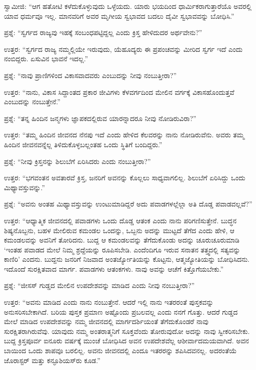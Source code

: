 ಸ್ವಾಮೀಜಿ: “ಆಗ ಹತೋಟಿ ಕಳೆದುಕೊಳ್ಳುವುದು ಒಳ್ಳೆಯದು. ಯಾರು ಭಯದಿಂದ ಧಾರ್ಮಿಕರಾಗುತ್ತಾರೆಯೊ ಅವರಲ್ಲಿ ಯಾವ ಧರ್ಮವೂ ಇಲ್ಲ. ಮಾನವರಿಗೆ ಅವರ ಮೃಗೀಯ ಸ್ವಭಾವದ ಬದಲು ದೈವೀ ಸ್ವಭಾವವನ್ನು ಬೋಧಿಸಿ.”

ಪ್ರಶ್ನೆ: “ಸ್ವರ್ಗದ ರಾಜ್ಯವು ಇಹಕ್ಕೆ ಸಂಬಂಧಪಟ್ಟಿದ್ದಲ್ಲ ಎಂದು ಕ್ರಿಸ್ತ ಹೇಳಿದುದರ ಅರ್ಥವೇನು?''

ಉತ್ತರ: “ಸ್ವರ್ಗದ ರಾಜ್ಯ ನಮ್ಮಲ್ಲಿಯೇ ಇರುವುದು, ಯೆಹೂದ್ಯರು ಈ ಪ್ರಪಂಚವನ್ನು ಮೀರಿದ ಸ್ವರ್ಗ ಇದೆ ಎಂದು ನಂಬಿದ್ದರು. ಏಸುವಿನ ಭಾವನೆ ಇದಲ್ಲ.”

ಪ್ರಶ್ನೆ: “ನಾವು ಪ್ರಾಣಿಗಳಿಂದ ವಿಕಾಸವಾದವರು ಎಂಬುದನ್ನು ನೀವು ನಂಬುತ್ತೀರಾ?''

ಉತ್ತರ: “ನಾನು, ವಿಕಾಸ ಸಿದ್ದಾಂತದ ಪ್ರಕಾರ ಜೀವಿಗಳು ಕೆಳವರ್ಗದಿಂದ ಮೇಲಿನ ವರ್ಗಕ್ಕೆ ವಿಕಾಸಹೊಂದುತ್ತವೆ ಎಂಬುದನ್ನು ನಂಬುತ್ತೇನೆ.”

ಪ್ರಶ್ನೆ: “ತನ್ನ ಹಿಂದಿನ ಜನ್ಮಗಳು ಜ್ಞಾಪಕದಲ್ಲಿರುವ ಯಾರನ್ನಾದರೂ ನೀವು ನೋಡಿರುವಿರಾ?”

ಉತ್ತರ: “ತಮ್ಮ ಹಿಂದಿನ ಜೀವನದ ನೆನಪು ಇದೆ ಎಂದು ಹೇಳಿದ ಕೆಲವರನ್ನು ನಾನು ನೋಡಿರುವೆನು. ಅವರು ತಮ್ಮ ಹಿಂದಿನ ಜೀವನವನ್ನೆಲ್ಲ ತಿಳಿದುಕೊಳ್ಳಬಲ್ಲಂತಹ ಒಂದು ಸ್ಥಿತಿಗೆ ಬಂದಿದ್ದರು.''

ಪ್ರಶ್ನೆ: “ನೀವು ಕ್ರಿಸ್ತನನ್ನು ಶಿಲುಬೆಗೆ ಏರಿಸಿದರು ಎಂದು ನಂಬುತ್ತೀರಾ?”

ಉತ್ತರ: “ಭಗವಂತನ ಅವತಾರವೆ ಕ್ರಿಸ್ತ, ಜನರಿಗೆ ಅವನನ್ನು ಕೊಲ್ಲಲು ಸಾಧ್ಯವಾಗಲಿಲ್ಲ. ಶಿಲುಬೆಗೆ ಏರಿಸಿದ್ದು ಒಂದು ಮಿಥ್ಯಾವಸ್ತುವನ್ನು.”

ಪ್ರಶ್ನೆ: “ಅವನು ಅಂತಹ ಮಿಥ್ಯಾವಸ್ತುವನ್ನು ಉಂಟುಮಾಡಿದ್ದರೆ ಅದು ಪವಾಡಗಳಲ್ಲೆಲ್ಲಾ ಅತಿ ದೊಡ್ಡ ಪವಾಡವಲ್ಲವೆ?”

ಉತ್ತರ: “ಆಧ್ಯಾತ್ಮಿಕ ಜೀವನದಲ್ಲಿ ಪವಾಡಗಳು ಒಂದು ದೊಡ್ಡ ಆತಂಕ ಎಂದು ನಾನು ಪರಿಗಣಿಸುತ್ತೇನೆ. ಬುದ್ಧನ ಶಿಷ್ಯನೊಬ್ಬನು, ಬಹಳ ಮೇಲಿರುವ ಕಮಂಡಲ ಒಂದನ್ನು, ಒಬ್ಬನು ಅದನ್ನು ಮುಟ್ಟದೆ ತೆಗೆದ ಎಂದು ಹೇಳಿ, ಆ ಕಮಂಡಲವನ್ನು ಅವನಿಗೆ ತೋರಿದನು. ಬುದ್ದ ಆ ಕಮಂಡಲವನ್ನು ತೆಗೆದುಕೊಂಡು ಅದನ್ನು ಚೂರುಚೂರುಮಾಡಿ `ಇಂತಹ ಪವಾಡದ ಮೇಲೆ ನಿಮ್ಮ ಶ್ರದ್ದೆಯನ್ನು ರೂಪಿಸಬೇಡಿ. ಎಂದೆಂದಿಗೂ ಇರುವ ಸನಾತನ ತತ್ತ್ವದಲ್ಲಿ ಸತ್ಯವನ್ನು ಕಾಣಿರಿ' ಎಂದನು. ಬುದ್ದನು ಜನರಿಗೆ ನಿಜವಾದ ಅಂತರ್ಜ್ಯೋತಿಯನ್ನು ಕೊಟ್ಟನು, ಆತ್ಮಜ್ಯೋತಿಯನ್ನು ಬೋಧಿಸಿದನು. ಇದೊಂದೆ ಸುರಕ್ಷಿತವಾದ ಮಾರ್ಗ. ಪವಾಡಗಳು ಆತಂಕಗಳು. ನಾವು ಅವನ್ನು ಆಚೆಗೆ ಕಿತ್ತೊಗೆಯಬೇಕು.”

ಪ್ರಶ್ನೆ: “ಜೀಸಸ್ ಗುಡ್ಡದ ಮೇಲಿನ ಉಪದೇಶವನ್ನು ಮಾಡಿದ ಎಂದು ನೀವು ನಂಬುತ್ತೀರಾ?”

ಉತ್ತರ: “ಅವನು ಮಾಡಿದ ಎಂದು ನಾನು ನಂಬುತ್ತೇನೆ. ಆದರೆ ಇಲ್ಲಿ ನಾನು ಇತರರಂತೆ ಪುಸ್ತಕವನ್ನು ಅನುಸರಿಸಬೇಕಾಗಿದೆ. ಬರಿಯ ಪುಸ್ತಕ ಪ್ರಮಾಣ ಅಷ್ಟೊಂದು ಪ್ರಬಲವಲ್ಲ ಎಂದು ನನಗೆ ಗೊತ್ತು. ಆದರೆ ಗುಡ್ಡದ ಮೇಲೆ ಮಾಡಿದ ಉಪದೇಶವನ್ನು ನಮ್ಮ ಜೀವನದಲ್ಲಿ ಮಾರ್ಗದರ್ಶಿಯಂತೆ ತೆಗೆದುಕೊಂಡರೆ ನಾವು ಸುರಕ್ಷಿತರಾಗಿರುವೆವು. ಯಾವುದು ನಮ್ಮ ಅಂತರಾತ್ಮನಿಗೆ ಸೂಕ್ತವೆಂದು ತೋರುವುದೋ ಅದನ್ನು ನಾವು ಸ್ವೀಕರಿಸಬೇಕು. ಬುದ್ದ ಕ್ರಿಸ್ತಪೂರ್ವ ಐನೂರು ವರ್ಷಕ್ಕೆ ಮುಂಚೆ ಬೋಧಿಸಿದ ಅವನ ಉಪದೇಶವೆಲ್ಲ ಆಶೀರ್ವಾದಮಯವಾಗಿದೆ. ಅವನ ಬಾಯಿಂದ ಒಂದು ಶಾಪವೂ ಬರಲಿಲ್ಲ. ಅವನು ಜೀವನದಲ್ಲಿ ಎಂದೂ ಇತರರನ್ನು ಶಪಿಸಿದವನಲ್ಲ. ಅದರಂತೆಯೆ ಜೊರಾಸ್ಟರ್‌ ಮತ್ತು ಕನ್ಫೂಶಿಯಸ್‌ರು ಕೂಡ.”

